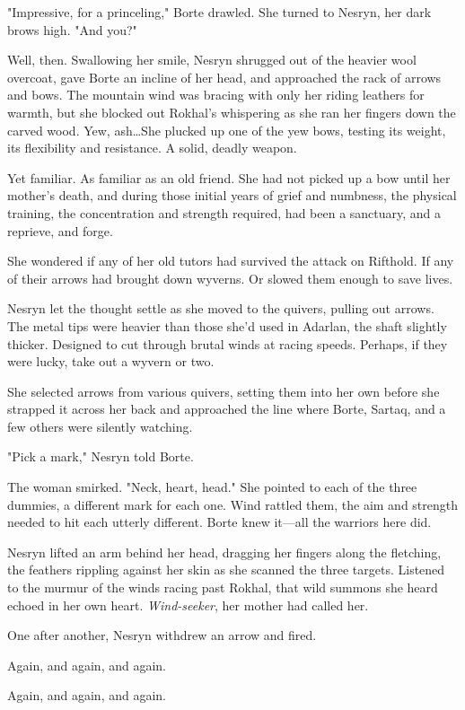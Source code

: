 "Impressive, for a princeling," Borte drawled.
She turned to Nesryn, her dark brows high.
"And you?"

Well, then.
Swallowing her smile, Nesryn shrugged out of the heavier wool overcoat, gave Borte an incline of her head, and approached the rack of arrows and bows.
The mountain wind was bracing with only her riding leathers for warmth, but she blocked out Rokhal's whispering as she ran her fingers down the carved wood.
Yew, ash\ldots She plucked up one of the yew bows, testing its weight, its flexibility and resistance.
A solid, deadly weapon.

Yet familiar.
As familiar as an old friend.
She had not picked up a bow until her mother's death, and during those initial years of grief and numbness, the physical training, the concentration and strength required, had been a sanctuary, and a reprieve, and forge.

She wondered if any of her old tutors had survived the attack on Rifthold.
If any of their arrows had brought down wyverns.
Or slowed them enough to save lives.

Nesryn let the thought settle as she moved to the quivers, pulling out arrows.
The metal tips were heavier than those she'd used in Adarlan, the shaft slightly thicker.
Designed to cut through brutal winds at racing speeds.
Perhaps, if they were lucky, take out a wyvern or two.

She selected arrows from various quivers, setting them into her own before she strapped it across her back and approached the line where Borte, Sartaq, and a few others were silently watching.

"Pick a mark," Nesryn told Borte.

The woman smirked.
"Neck, heart, head."
She pointed to each of the three dummies, a different mark for each one.
Wind rattled them, the aim and strength needed to hit each utterly different.
Borte knew it---all the warriors here did.

Nesryn lifted an arm behind her head, dragging her fingers along the fletching, the feathers rippling against her skin as she scanned the three targets.
Listened to the murmur of the winds racing past Rokhal, that wild summons she heard echoed in her own heart.
\emph{Wind-seeker}, her mother had called her.

One after another, Nesryn withdrew an arrow and fired.

Again, and again, and again.

Again, and again, and again.

